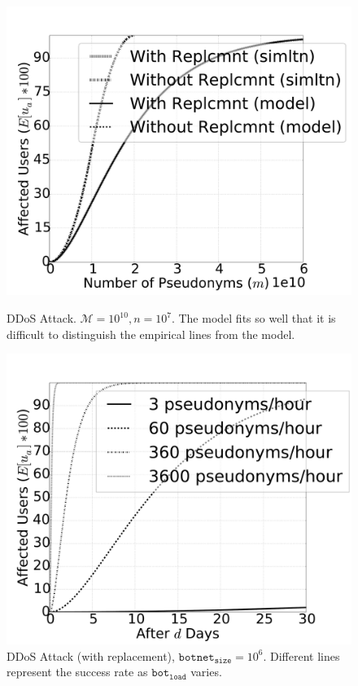 \documentclass{llncs} %
\begin{document}
\begin{figure}[]
  \centering
  \begin{minipage}[b]{0.49\textwidth}
    \includegraphics[width=\textwidth]{sim_and_mod.pdf}
   \caption{DDoS Attack. $ \mathcal{M} = 10^{10}, n = 10^{7}$. The model fits so well that it is difficult to distinguish the empirical lines from the model.}
\label{fig:simulation_and_modeling}
  \end{minipage}
  \hfill
  \begin{minipage}[b]{0.49\textwidth}
    \includegraphics[width=\textwidth]{botplot.pdf}
    \caption{DDoS Attack (with replacement), $\texttt{botnet}_{\texttt{size}} = 10^6$. Different lines represent the success rate as $\texttt{bot}_{\texttt{load}}$ varies.}
  \label{fig:botplot}
  \end{minipage}
\end{figure}
\end{document}
